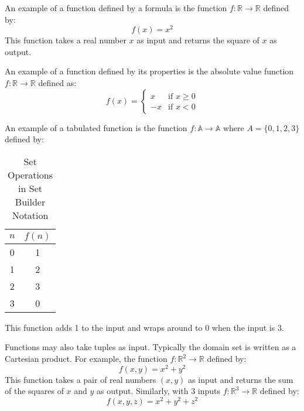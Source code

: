 An example of a function defined by a formula is the function \( f: \mathbb{R} \to \mathbb{R} \) 
defined by:
\[
  f(x) = x^2
\]
\noindent This function takes a real number \( x \) as input and returns the square of \( x \) as 
output. 

An example of a function defined by its properties is the absolute value function 
\( f: \mathbb{R} \to \mathbb{R} \) defined as:
\[
  f(x) = \begin{cases}
    x & \text{if } x \geq 0 \\
    -x & \text{if } x < 0
  \end{cases}
\]
  
An example of a tabulated function is the function \( f: \mathbb{A} \to \mathbb{A} \) 
where \( A = \{ 0, 1, 2, 3 \}\) defined by:
\begin{table}[H]
  \centering
  \begin{tabular}{cc}
    \toprule
    \textbf{\(n\)} & \textbf{\(f(n)\)} \\
    \midrule
    0 & 1 \\
    1 & 2 \\
    2 & 3 \\
    3 & 0 \\
    \bottomrule
  \end{tabular}
  \caption{Set Operations in Set Builder Notation}
\end{table}
\noindent This function adds 1 to the input and wraps around to 0 when the input is 3.

Functions may also take tuples as input. Typically the domain set is written as a Cartesian 
product. For example, the function \( f: \mathbb{R}^2 \to \mathbb{R} \) defined by:
\[
  f(x, y) = x^2 + y^2
\]
\noindent This function takes a pair of real numbers \( (x, y) \) as input and returns the sum of 
the squares of \( x \) and \( y \) as output. Similarly, with 3 inputs \( f: \mathbb{R}^3 \to 
\mathbb{R} \) defined by:
\[
  f(x, y, z) = x^2 + y^2 + z^2
\]


